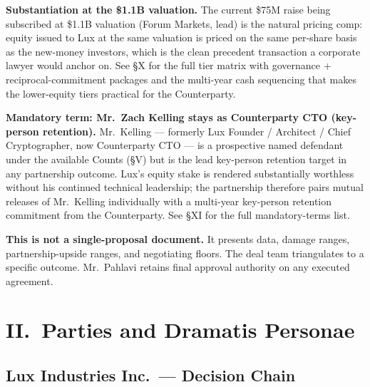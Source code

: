 \documentclass[11pt,letterpaper]{article}
\begin{document}
\textbf{Substantiation at the \$1.1B valuation.} The current \$75M
raise being subscribed at \$1.1B valuation (Forum Markets, lead) is
the natural pricing comp: equity issued to Lux at the same valuation
is priced on the same per-share basis as the new-money investors,
which is the clean precedent transaction a corporate lawyer would
anchor on. See \S X for the full tier matrix with governance +
reciprocal-commitment packages and the multi-year cash sequencing
that makes the lower-equity tiers practical for the Counterparty.

\textbf{Mandatory term: Mr.\ Zach Kelling stays as Counterparty CTO
(key-person retention).} Mr.\ Kelling --- formerly Lux Founder /
Architect / Chief Cryptographer, now Counterparty CTO --- is a
prospective named defendant under the available Counts (\S V) but
is the lead key-person retention target in any partnership outcome.
Lux's equity stake is rendered substantially worthless without his
continued technical leadership; the partnership therefore pairs
mutual releases of Mr.\ Kelling individually with a multi-year
key-person retention commitment from the Counterparty. See \S XI
for the full mandatory-terms list.

\textbf{This is not a single-proposal document.} It presents data,
damage ranges, partnership-upside ranges, and negotiating floors.
The deal team triangulates to a specific outcome. Mr.\ Pahlavi
retains final approval authority on any executed agreement.

\section*{II.\ Parties and Dramatis Personae}

\subsection*{Lux Industries Inc.\ --- Decision Chain}
\end{document}
